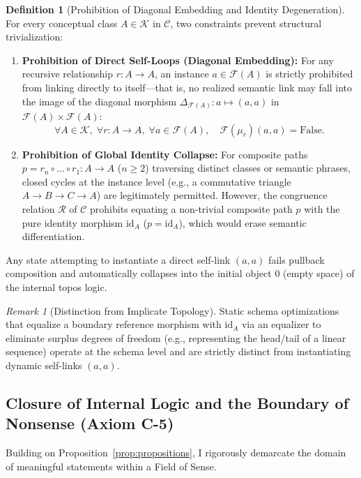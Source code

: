 \documentclass[11pt,a4paper]{article}
\theoremstyle{definition}
\newtheorem{definition}{Definition}[section]
\theoremstyle{plain}
\theoremstyle{remark}
\newtheorem{remark}{Remark}[section]
\newcommand{\id}{\mathrm{id}}
\begin{document}
\begin{definition}[Prohibition of Diagonal Embedding and Identity Degeneration]\label{def:non-degeneracy}
For every conceptual class $A \in \mathcal{K}$ in $\mathcal{C}$, two constraints prevent structural trivialization:
\begin{enumerate}
    \item \textbf{Prohibition of Direct Self-Loops (Diagonal Embedding):} For any recursive relationship $r : A \to A$, an instance $a \in \mathcal{F}(A)$ is strictly prohibited from linking directly to itself---that is, no realized semantic link may fall into the image of the diagonal morphism $\Delta_{\mathcal{F}(A)} : a \mapsto (a, a)$ in $\mathcal{F}(A) \times \mathcal{F}(A)$:
    \begin{equation}
    \forall A \in \mathcal{K},\; \forall r : A \to A,\; \forall a \in \mathcal{F}(A),\quad \mathcal{F}(\mu_r)(a, a) = \mathrm{False}.
    \end{equation}
    \item \textbf{Prohibition of Global Identity Collapse:} For composite paths $p = r_n \circ \dots \circ r_1 : A \to A$ ($n \ge 2$) traversing distinct classes or semantic phrases, closed cycles at the instance level (e.g., a commutative triangle $A \to B \to C \to A$) are legitimately permitted. However, the congruence relation $\mathcal{R}$ of $\mathcal{C}$ prohibits equating a non-trivial composite path $p$ with the pure identity morphism $\id_A$ ($p = \id_A$), which would erase semantic differentiation.
\end{enumerate}
\end{definition}

Any state attempting to instantiate a direct self-link $(a, a)$ fails pullback composition and automatically collapses into the initial object $0$ (empty space) of the internal topos logic.

\begin{remark}[Distinction from Implicate Topology]
Static schema optimizations that equalize a boundary reference morphism with $\id_A$ via an equalizer to eliminate surplus degrees of freedom (e.g., representing the head/tail of a linear sequence) operate at the schema level and are strictly distinct from instantiating dynamic self-links $(a, a)$.
\end{remark}

\subsection{Closure of Internal Logic and the Boundary of Nonsense (Axiom C-5)}
Building on Proposition~\ref{prop:propositions}, I rigorously demarcate the domain of meaningful statements within a Field of Sense.
\end{document}
